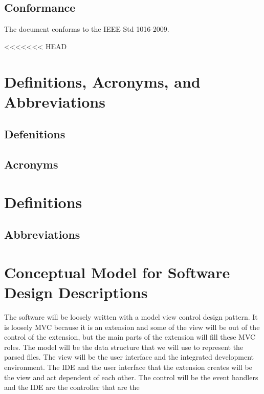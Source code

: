 \documentclass[letterpaper,10pt,titlepage,draftclsnofoot,onecolumn,onesided] {IEEEtran}
\begin{document}
\subsection{Conformance}
The document conforms to the IEEE Std 1016-2009.

<<<<<<< HEAD
\section{Definitions, Acronyms, and Abbreviations}

\subsection{Defenitions}
\newtheorem{Model-View-Controller (MVC)}{Is a design pattern assigns objects in an application one of three roles: model, view, or controller. The pattern defines not only the roles objects play in the application, it defines the way objects communicate with each other. Each of the three types of objects is separated from the others by abstract boundaries and communicates with objects of the other types across those boundaries. The collection of objects of a certain MVC type in an application is sometimes referred to as a layer—for example, model layer.\cite{appleMVC}}
\newtheorem{Integrated Developement Environment}{}

\subsection{Acronyms}
\section{Definitions}
\newtheorem{VSC}{An acronym of Visual Studio Code. Visual Studio Code is the IDE for which the postal extension is being built.}
\newtheorem{IDE}{An acronym of Integrated Development Environment.}
\newtheorem{UI}{An acronym of User Interface}
\newtheorem{MVC}{Model-View-Controller}

\subsection{Abbreviations}


\section{Conceptual Model for Software Design Descriptions}
The software will be loosely written with a model view control design pattern.
It is loosely MVC because it is an extension and some of the view will be out of the control of the extension, but the main parts of the extension will fill these MVC roles.
The model will be the data structure that we will use to represent the parsed files. 
The view will be the user interface and the integrated development environment.
The IDE and the user interface that the extension creates will be the view and act dependent of each other.
The control will be the event handlers and the IDE are the controller that are the 
\end{document}
